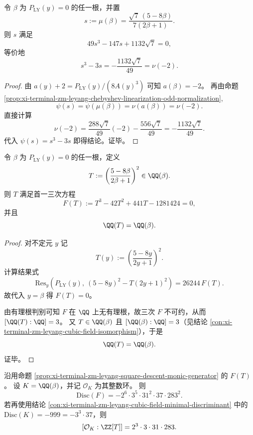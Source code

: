 \begin{theorem}\label{thm:xi-terminal-zm-leyang-ply-root-chebyshev-cubic}
令 \(\beta\) 为 \(P_{\mathrm{LY}}(y)=0\) 的任一根，并置
\[
s:=\mu(\beta)=\frac{\sqrt7\,(5-8\beta)}{7(2\beta+1)}.
\]
则 \(s\) 满足
\[
49s^3-147s+1132\sqrt7=0,
\]
等价地
\[
s^3-3s=-\frac{1132\sqrt7}{49}=\nu(-2).
\]
\end{theorem}

\begin{proof}
由 \(a(y)+2=P_{\mathrm{LY}}(y)/(8A(y)^3)\) 可知 \(a(\beta)=-2\)。
再由命题 \ref{prop:xi-terminal-zm-leyang-chebyshev-linearization-odd-normalization},
\[
\psi(s)=\psi(\mu(\beta))=\nu(a(\beta))=\nu(-2).
\]
直接计算
\[
\nu(-2)=\frac{288\sqrt7}{49}(-2)-\frac{556\sqrt7}{49}
=-\frac{1132\sqrt7}{49}.
\]
代入 \(\psi(s)=s^3-3s\) 即得结论。证毕。
\end{proof}

\begin{proposition}[平方下降生成元与首一整式模型]\label{prop:xi-terminal-zm-leyang-square-descent-monic-generator}
令 \(\beta\) 为 \(P_{\mathrm{LY}}(y)=0\) 的任一根，定义
\[
T:=\left(\frac{5-8\beta}{2\beta+1}\right)^2\in\QQ(\beta).
\]
则 \(T\) 满足首一三次方程
\[
F(T):=T^3-42T^2+441T-1281424=0,
\]
并且
\[
\QQ(T)=\QQ(\beta).
\]
\end{proposition}

\begin{proof}
对不定元 \(y\) 记
\[
T(y):=\left(\frac{5-8y}{2y+1}\right)^2.
\]
计算结果式
\[
\mathrm{Res}_y\!\left(P_{\mathrm{LY}}(y),\ (5-8y)^2-T(2y+1)^2\right)
=26244\,F(T).
\]
故代入 \(y=\beta\) 得 \(F(T)=0\)。

由有理根判别可知 \(F\) 在 \(\QQ\) 上无有理根，故三次 \(F\) 不可约，从而
\(
[\QQ(T):\QQ]=3
\)。
又 \(T\in\QQ(\beta)\) 且 \([\QQ(\beta):\QQ]=3\)（见结论 \ref{con:xi-terminal-zm-leyang-cubic-field-isomorphism}），于是
\[
\QQ(T)=\QQ(\beta).
\]
证毕。
\end{proof}

\begin{theorem}[新生成元的判别式与整指数]\label{thm:xi-terminal-zm-leyang-square-descent-discriminant-index}
沿用命题 \ref{prop:xi-terminal-zm-leyang-square-descent-monic-generator} 的 \(F(T)\)。
设 \(K=\QQ(\beta)\)，并记 \(\mathcal O_K\) 为其整数环。
则
\[
\mathrm{Disc}(F)= -2^6\cdot 3^5\cdot 31^2\cdot 37\cdot 283^2.
\]
若再使用结论 \ref{con:xi-terminal-zm-leyang-cubic-field-minimal-discriminant}
中的
\(
\mathrm{Disc}(K)=-999=-3^3\cdot 37
\)，则
\[
[\mathcal O_K:\ZZ[T]]
=2^3\cdot 3\cdot 31\cdot 283.
\]
\end{theorem}

